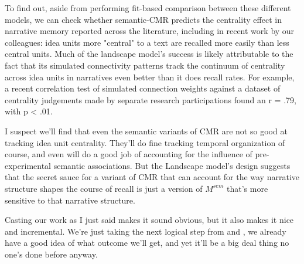 To find out, aside from performing fit-based comparison between these different models, we can check whether semantic-CMR predicts the centrality effect in narrative memory reported across the literature, including in recent work by our colleagues: idea units more "central" to a text are recalled more easily than less central units. Much of the landscape model's success is likely attributable to the fact that its simulated connectivity patterns track the continuum of centrality across idea units in narratives even better than it does recall rates. For example, a recent correlation test of simulated connection weights against a dataset of centrality judgements made by separate research participations found an r = .79, with p < .01.

I suspect we'll find that even the semantic variants of CMR are not so good at tracking idea unit centrality. They'll do fine tracking temporal organization of course, and even will do a good job of accounting for the influence of pre-experimental semantic associations. But the Landscape model's design suggests that the secret sauce for a variant of CMR that can account for the way narrative structure shapes the course of recall is just a version of $M^{sem}$ that's more sensitive to that narrative structure.

Casting our work as I just said makes it sound obvious, but it also makes it nice and incremental. We're just taking the next logical step from \citet{morton2016predictive} and \citet{yeari2016computational}, we already have a good idea of what outcome we'll get, and yet it'll be a big deal thing no one's done before anyway.